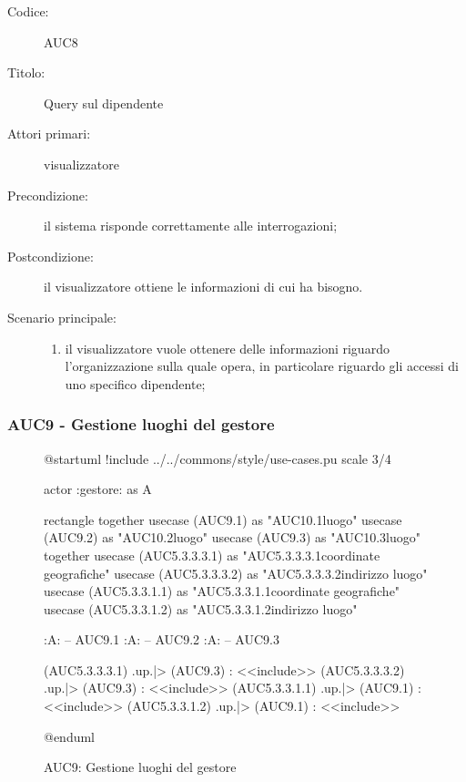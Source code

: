 \documentclass[../analisi-dei-requisiti.tex]{subfiles}
\begin{document}
\begin{description}
  \item[Codice:] AUC8
  \item[Titolo:] Query sul dipendente
  \item[Attori primari:] visualizzatore
  \item[Precondizione:] il sistema risponde correttamente alle interrogazioni;
  \item[Postcondizione:] il visualizzatore ottiene le informazioni di cui ha bisogno.
  \item[Scenario principale:]
  \begin{enumerate}
    \item il visualizzatore vuole ottenere delle informazioni riguardo l'organizzazione sulla quale opera, in particolare riguardo gli accessi di uno specifico dipendente;
  \end{enumerate}
\end{description}

\subsubsection{AUC9 - Gestione luoghi del gestore}%
\label{subsub:AUC9}

\begin{figure}[h!]
  \centering
  \begin{plantuml}
  @startuml
  !include ../../commons/style/use-cases.pu
  scale 3/4

  actor :gestore: as A

  rectangle {
    together {
      usecase (AUC9.1) as "AUC10.1\nAggiunta luogo"
      usecase (AUC9.2) as "AUC10.2\nRimozione luogo"
      usecase (AUC9.3) as "AUC10.3\nModifica luogo"
    }
    together {
      usecase (AUC5.3.3.3.1) as "AUC5.3.3.3.1\nModifica coordinate geografiche"
      usecase (AUC5.3.3.3.2) as "AUC5.3.3.3.2\nModifica indirizzo luogo"
      usecase (AUC5.3.3.1.1) as "AUC5.3.3.1.1\nInserisci coordinate geografiche"
      usecase (AUC5.3.3.1.2) as "AUC5.3.3.1.2\nInserisci indirizzo luogo"
    }
  }

  :A: -- AUC9.1
  :A: -- AUC9.2
  :A: -- AUC9.3

  (AUC5.3.3.3.1) .up.|> (AUC9.3) : <<include>>
  (AUC5.3.3.3.2) .up.|> (AUC9.3) : <<include>>
  (AUC5.3.3.1.1) .up.|> (AUC9.1) : <<include>>
  (AUC5.3.3.1.2) .up.|> (AUC9.1) : <<include>>

  @enduml
  \end{plantuml}
  \caption{AUC9: Gestione luoghi del gestore}
  \label{fig:AUC9}
\end{figure}
\end{document}
